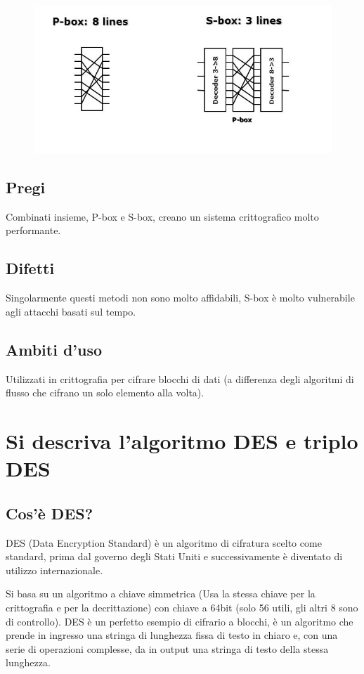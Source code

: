 \begin{figure}[H]
\centering
\includegraphics[scale=0.6]{res/img/52_P-boxS-box.png}
\end{figure}

\subsection{Pregi}
Combinati insieme, P-box e S-box, creano un sistema crittografico molto performante.
\subsection{Difetti}
Singolarmente questi metodi non sono molto affidabili, S-box è molto vulnerabile agli attacchi basati sul tempo.
\subsection{Ambiti d'uso}
Utilizzati in crittografia per cifrare blocchi di dati (a differenza degli algoritmi di flusso che cifrano un solo elemento alla volta).

\section{Si descriva l'algoritmo DES e triplo DES}
\subsection{Cos'è DES?}
DES (Data Encryption Standard) è un algoritmo di cifratura scelto come standard, prima dal governo degli Stati Uniti e successivamente è diventato di utilizzo internazionale.

Si basa su un algoritmo a chiave simmetrica (Usa la stessa chiave per la crittografia e per la decrittazione) con chiave a 64bit (solo 56 utili, gli altri 8 sono di controllo).
DES è un perfetto esempio di cifrario a blocchi, è un algoritmo che prende in ingresso una stringa di lunghezza fissa di testo in chiaro e, con una serie di operazioni complesse, da in output una stringa di testo della stessa lunghezza.

